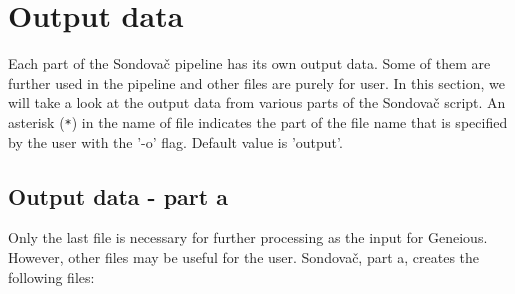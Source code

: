 \section{Output data}
Each part of the Sondovač pipeline has its own output data. Some of them are further used in the pipeline and other files are purely for user. In this section, we will 
take a look at the output data from various parts of the Sondovač script. 
An asterisk (\verb_*_) in the name of file indicates the part of the file name that is specified by the user with the '-o' flag. Default value is 'output'. 

\subsection{Output data - part a}

Only the last file is necessary for further processing as the input for Geneious. However, other files may be useful for the user. 
Sondovač, part a, creates the following files: 


